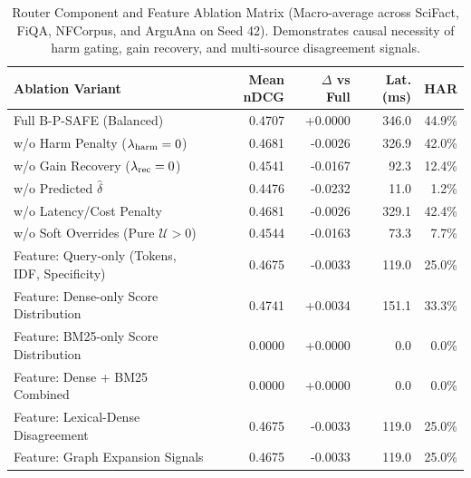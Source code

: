 \begin{table}[t]
\centering
\caption{Router Component and Feature Ablation Matrix (Macro-average across SciFact, FiQA, NFCorpus, and ArguAna on Seed 42). Demonstrates causal necessity of harm gating, gain recovery, and multi-source disagreement signals.}
\label{tab:ablations}
\scriptsize
\setlength{\tabcolsep}{1.2pt}
\begin{tabular}{lrrrr}
\toprule
Ablation Variant & Mean nDCG & $\Delta$ vs Full & Lat. (ms) & HAR \\
\midrule
Full B-P-SAFE (Balanced) & 0.4707 & +0.0000 & 346.0 & 44.9\% \\
w/o Harm Penalty ($\lambda_{\rm harm}=0$) & 0.4681 & -0.0026 & 326.9 & 42.0\% \\
w/o Gain Recovery ($\lambda_{\rm rec}=0$) & 0.4541 & -0.0167 & 92.3 & 12.4\% \\
w/o Predicted $\hat{\delta}$ & 0.4476 & -0.0232 & 11.0 & 1.2\% \\
w/o Latency/Cost Penalty & 0.4681 & -0.0026 & 329.1 & 42.4\% \\
w/o Soft Overrides (Pure $\mathcal{U}>0$) & 0.4544 & -0.0163 & 73.3 & 7.7\% \\
\midrule
Feature: Query-only (Tokens, IDF, Specificity) & 0.4675 & -0.0033 & 119.0 & 25.0\% \\
Feature: Dense-only Score Distribution & 0.4741 & +0.0034 & 151.1 & 33.3\% \\
Feature: BM25-only Score Distribution & 0.0000 & +0.0000 & 0.0 & 0.0\% \\
Feature: Dense + BM25 Combined & 0.0000 & +0.0000 & 0.0 & 0.0\% \\
Feature: Lexical-Dense Disagreement & 0.4675 & -0.0033 & 119.0 & 25.0\% \\
Feature: Graph Expansion Signals & 0.4675 & -0.0033 & 119.0 & 25.0\% \\
\bottomrule
\end{tabular}
\end{table}